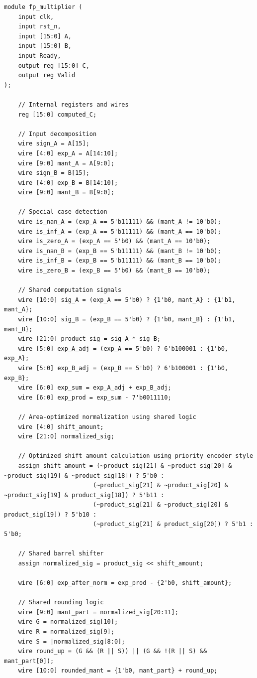 \documentclass[UTF8]{ctexart}
\begin{document}
\begin{lstlisting}[frame=shadowbox,caption=fp\_multiplier\_generated3.sv]
module fp_multiplier (
    input clk,
    input rst_n,
    input [15:0] A,
    input [15:0] B,
    input Ready,
    output reg [15:0] C,
    output reg Valid
);

    // Internal registers and wires
    reg [15:0] computed_C;
    
    // Input decomposition
    wire sign_A = A[15];
    wire [4:0] exp_A = A[14:10];
    wire [9:0] mant_A = A[9:0];
    wire sign_B = B[15];
    wire [4:0] exp_B = B[14:10];
    wire [9:0] mant_B = B[9:0];
    
    // Special case detection
    wire is_nan_A = (exp_A == 5'b11111) && (mant_A != 10'b0);
    wire is_inf_A = (exp_A == 5'b11111) && (mant_A == 10'b0);
    wire is_zero_A = (exp_A == 5'b0) && (mant_A == 10'b0);
    wire is_nan_B = (exp_B == 5'b11111) && (mant_B != 10'b0);
    wire is_inf_B = (exp_B == 5'b11111) && (mant_B == 10'b0);
    wire is_zero_B = (exp_B == 5'b0) && (mant_B == 10'b0);
    
    // Shared computation signals
    wire [10:0] sig_A = (exp_A == 5'b0) ? {1'b0, mant_A} : {1'b1, mant_A};
    wire [10:0] sig_B = (exp_B == 5'b0) ? {1'b0, mant_B} : {1'b1, mant_B};
    wire [21:0] product_sig = sig_A * sig_B;
    wire [5:0] exp_A_adj = (exp_A == 5'b0) ? 6'b100001 : {1'b0, exp_A};
    wire [5:0] exp_B_adj = (exp_B == 5'b0) ? 6'b100001 : {1'b0, exp_B};
    wire [6:0] exp_sum = exp_A_adj + exp_B_adj;
    wire [6:0] exp_prod = exp_sum - 7'b0011110;
    
    // Area-optimized normalization using shared logic
    wire [4:0] shift_amount;
    wire [21:0] normalized_sig;
    
    // Optimized shift amount calculation using priority encoder style
    assign shift_amount = (~product_sig[21] & ~product_sig[20] & ~product_sig[19] & ~product_sig[18]) ? 5'b0 :
                         (~product_sig[21] & ~product_sig[20] & ~product_sig[19] & product_sig[18]) ? 5'b11 :
                         (~product_sig[21] & ~product_sig[20] & product_sig[19]) ? 5'b10 :
                         (~product_sig[21] & product_sig[20]) ? 5'b1 : 5'b0;
    
    // Shared barrel shifter
    assign normalized_sig = product_sig << shift_amount;
    
    wire [6:0] exp_after_norm = exp_prod - {2'b0, shift_amount};
    
    // Shared rounding logic
    wire [9:0] mant_part = normalized_sig[20:11];
    wire G = normalized_sig[10];
    wire R = normalized_sig[9];
    wire S = |normalized_sig[8:0];
    wire round_up = (G && (R || S)) || (G && !(R || S) && mant_part[0]);
    wire [10:0] rounded_mant = {1'b0, mant_part} + round_up;
    

\end{lstlisting}
\end{document}
